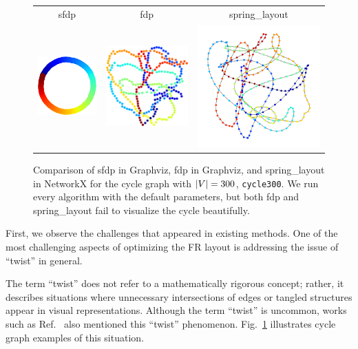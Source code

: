 \documentclass[dvipdfmx,journal]{IEEEtran}
\begin{document}
\begin{figure}[t]
    \centering
    \begin{tabular}{ccc}
        \textsf{sfdp}                                                   & \textsf{fdp} & \textsf{spring\_layout} \\
        \includegraphics[width=0.273\columnwidth]{cycle/cycle_sfdp.png} &
        \includegraphics[width=0.273\columnwidth]{cycle/cycle_fdp.png}  &
        \includegraphics[width=0.273\columnwidth]{cycle/cycle_fr.png}                                            \\
    \end{tabular}
    \caption{
        Comparison of \textsf{sfdp} in Graphviz, \textsf{fdp} in Graphviz, and \textsf{spring\_layout} in NetworkX for the cycle graph with $\abs{V} = 300$, \texttt{cycle300}.
        We run every algorithm with the default parameters, but both \textsf{fdp} and \textsf{spring\_layout} fail to visualize the cycle beautifully.
    }
    \label{fig:cycle}
\end{figure}

First, we observe the challenges that appeared in existing methods.
One of the most challenging aspects of optimizing the FR layout is addressing the issue of ``twist'' in general.

The term ``twist'' does not refer to a mathematically rigorous concept; rather, it describes situations where unnecessary intersections of edges or tangled structures appear in visual representations.
Although the term ``twist'' is uncommon, works such as Ref.~\cite{cheongSnapshotVisualizationComplex2018} also mentioned this ``twist'' phenomenon. Fig.~\ref{fig:cycle} illustrates cycle graph examples of this situation.
\end{document}
